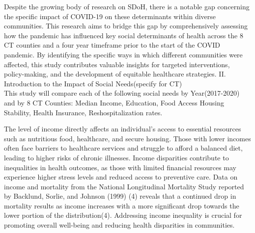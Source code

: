 \documentclass[12pt]{article}
\begin{document}
Despite the growing body of research on SDoH, there is a notable gap concerning the specific impact of COVID-19 on 
these determinants within diverse communities. This research aims to bridge this gap by comprehensively assessing how 
the pandemic has influenced key social determinants of health across the 8 CT counties and a four year timeframe prior to 
the start of the COVID pandemic. 
By identifying the specific ways in which different communities were affected, this study contributes valuable insights 
for targeted interventions, policy-making, and the development of equitable healthcare strategies.
\@
II. Introduction to the Impact of Social Needs(specify for CT)
\\
This study will compare each of the following social needs by Year(2017-2020) and by 8 CT Counties: 
Median Income,
Education,
Food Access
Housing Stability,
Health Insurance,
Reshospitalization rates.

The level of income
directly affects an individual's access
to essential resources such as nutritious
food, healthcare, and secure housing.
Those with lower incomes often face
barriers to healthcare services and
struggle to afford a balanced diet,
leading to higher risks of chronic
illnesses. Income disparities contribute
to inequalities in health outcomes, as
those with limited financial resources
may experience higher stress levels and
reduced access to preventive care. 
Data on income and mortality from the National Longitudinal Mortality Study reported by Backlund, Sorlie, and Johnson (1999) (4)
reveals that a continued drop in mortality results as income increases with a more significant drop towards the lower portion of the distribution(4).
Addressing income inequality is crucial
for promoting overall well-being and
reducing health disparities in communities.
\end{document}
